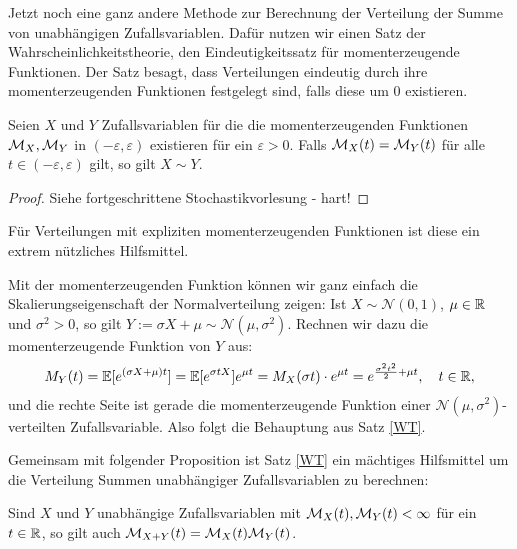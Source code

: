 Jetzt noch eine ganz andere Methode zur Berechnung der Verteilung der Summe von unabh\"angigen Zufallsvariablen. Daf\"ur nutzen wir einen Satz der Wahrscheinlichkeitstheorie, den Eindeutigkeitssatz f\"ur momenterzeugende Funktionen. Der Satz besagt, dass Verteilungen eindeutig durch ihre momenterzeugenden Funktionen festgelegt sind, falls diese um $0$ existieren.
\begin{satz}\label{WT}
	Seien $X$ und $Y$ Zufallsvariablen f\"ur die die momenterzeugenden Funktionen $\mathcal{M}_X,\mathcal{M}_Y$ in $(-\varepsilon,\varepsilon)$ existieren für ein $\varepsilon > 0$. Falls $\mathcal{M}_X(t) = \mathcal{M}_Y(t)$ für alle $t \in (-\varepsilon,\varepsilon)$ gilt, so gilt $X\sim Y$.
	\end{satz}
\begin{proof}
	Siehe fortgeschrittene Stochastikvorlesung - hart!
\end{proof}
F\"ur Verteilungen mit expliziten momenterzeugenden Funktionen ist diese ein extrem n\"utzliches Hilfsmittel. 
\begin{beispiel}\label{B55}
	Mit der momenterzeugenden Funktion k\"onnen wir ganz einfach die Skalierungseigenschaft der Normalverteilung zeigen: Ist $X\sim \mathcal N(0,1)$, $\mu\in \mathbb{R}$ und $\sigma^2>0$, so gilt $Y:=\sigma X+\mu \sim \mathcal N(\mu,\sigma^2)$. Rechnen wir dazu die momenterzeugende Funktion von $Y$ aus:
	\begin{align*}
		M_Y(t)=\mathbb{E}[e^{(\sigma X  + \mu)t}]=\mathbb{E}[e^{\sigma t X}]e^{\mu t}=M_{X}(\sigma t)\cdot e^{\mu t}= e^{\frac{\sigma^2 t^2}{2}+\mu t},\quad t\in \mathbb{R},
	\end{align*}
	und die rechte Seite ist gerade die momenterzeugende Funktion einer $\mathcal N(\mu, \sigma^2)$-verteilten Zufallsvariable. Also folgt die Behauptung aus Satz \ref{WT}.
\end{beispiel}


Gemeinsam mit folgender Proposition ist Satz \ref{WT} ein m\"achtiges Hilfsmittel um die Verteilung Summen unabh\"angiger Zufallsvariablen zu berechnen:
\begin{prop}\label{P7}
	Sind $X$ und $Y$ unabhängige Zufallsvariablen mit $\mathcal{M}_X(t),\mathcal{M}_Y(t) < \infty$ f\"ur ein $t\in\mathbb{R}$, so gilt auch $\mathcal{M}_{X+Y}(t) = \mathcal{M}_X(t)\mathcal{M}_Y(t)$.
\end{prop}

